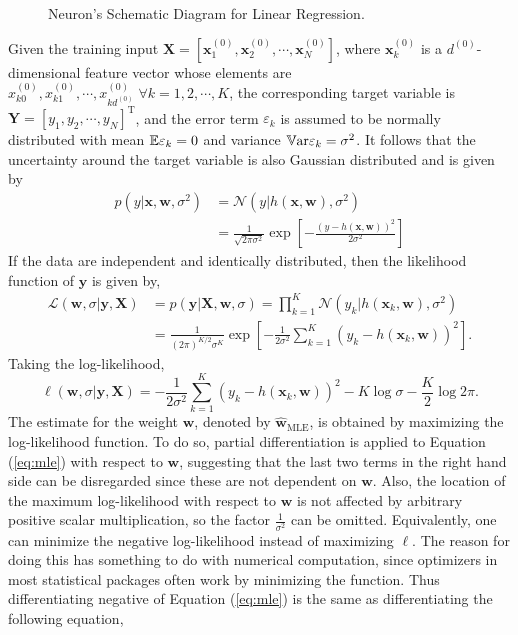 \begin{figure}[t]
\caption[Neuron's Schematic Diagram for Linear Regression]{Neuron's Schematic Diagram for Linear Regression.}
\label{fig:slrnn}
\end{figure}
Given the training input $\mathbf{X}=[\mathbf{x}_1^{(0)},\mathbf{x}_2^{(0)},\cdots,\mathbf{x}_N^{(0)}]$, where $\mathbf{x}_k^{(0)}$ is a $d^{(0)}$-dimensional feature vector whose elements are $x_{k0}^{(0)},x_{k1}^{(0)},\cdots, x_{kd^{(0)}}^{(0)}\;\forall k=1,2,\cdots,K$, the corresponding target variable is $\mathbf{Y}=[y_1,y_2,\cdots,y_N]^{\mathrm{T}}$, and the error term $\varepsilon_k$ is assumed to be normally distributed with mean $\mathbb{E}\varepsilon_k=0$ and variance $\mathbb{V}\text{ar}\varepsilon_k=\sigma^2$. It follows that the uncertainty around the target variable is also Gaussian distributed and is given by
\begin{align}
p(y|\mathbf{x},\mathbf{w},\sigma^2)&=\mathcal{N}(y|h(\mathbf{x},\mathbf{w}),\sigma^2)\nonumber\\
&=\frac{1}{\sqrt{2\pi\sigma^{2}}}\exp\left[-\frac{(y-h(\mathbf{x},\mathbf{w}))^2}{2\sigma^{2}}\right]
\end{align}
If the data are independent and identically distributed, then the likelihood function of $\mathbf{y}$ is given by,
\begin{align}
\mathcal{L}(\mathbf{w},\sigma|\mathbf{y},\mathbf{X})&=p(\mathbf{y}|\mathbf{X},\mathbf{w},\sigma)=\prod_{k=1}^{K}\mathcal{N}(y_k|h(\mathbf{x}_k,\mathbf{w}),\sigma^2)\nonumber\\
&=\frac{1}{(2\pi)^{K/2}\sigma^K}\exp\left[-\frac{1}{2\sigma^2}\sum_{k=1}^{K}(y_k-h(\mathbf{x}_k,\mathbf{w}))^2\right].
\end{align}
Taking the log-likelihood,
\begin{equation}
\label{eq:mle}
\ell(\mathbf{w},\sigma|\mathbf{y},\mathbf{X})=-\frac{1}{2\sigma^2}\sum_{k=1}^K(y_k-h(\mathbf{x}_k,\mathbf{w}))^2-K\log\sigma-\frac{K}{2}\log 2\pi.
\end{equation}
The estimate for the weight $\mathbf{w}$, denoted by $\hat{\mathbf{w}}_{\mathrm{MLE}}$, is obtained by maximizing the log-likelihood function. To do so, partial differentiation is applied to Equation (\ref{eq:mle}) with respect to $\mathbf{w}$, suggesting that the last two terms in the right hand side can be disregarded since these are not dependent on $\mathbf{w}$. Also, the location of the maximum log-likelihood with respect to $\mathbf{w}$ is not affected by arbitrary positive scalar multiplication, so the factor $\frac{1}{\sigma^2}$ can be omitted. Equivalently, one can minimize the negative log-likelihood instead of maximizing $\ell$. The reason for doing this has something to do with numerical computation, since optimizers in most statistical packages often work by minimizing the function. Thus differentiating negative of Equation (\ref{eq:mle}) is the same as differentiating the following equation,
